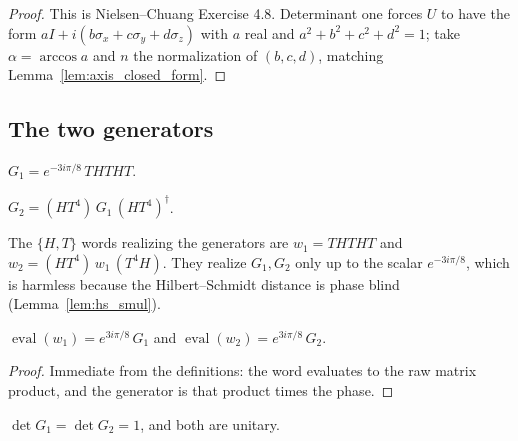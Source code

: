 \begin{proof}
  \leanok
  This is Nielsen--Chuang Exercise 4.8.  Determinant one forces $U$ to have the
  form $aI + i(b\sigma_x + c\sigma_y + d\sigma_z)$ with $a$ real and
  $a^2 + b^2 + c^2 + d^2 = 1$; take $\alpha = \arccos a$ and $n$ the
  normalization of $(b,c,d)$, matching Lemma~\ref{lem:axis_closed_form}.
\end{proof}

\subsection{The two generators}

\begin{definition}
  \label{def:g1}
  \leanok
  $G_1 = e^{-3i\pi/8}\, THTHT$.
\end{definition}

\begin{definition}
  \label{def:g2}
  \leanok
  $G_2 = (HT^4)\, G_1\, (HT^4)^\dagger$.
\end{definition}

\begin{definition}
  \label{def:g_words}
  \leanok
  The $\{H,T\}$ words realizing the generators are
  $w_1 = THTHT$ and $w_2 = (HT^4)\,w_1\,(T^4H)$.  They realize $G_1, G_2$ only
  up to the scalar $e^{-3i\pi/8}$, which is harmless because the
  Hilbert--Schmidt distance is phase blind (Lemma~\ref{lem:hs_smul}).
\end{definition}

\begin{lemma}
  \label{lem:g_word_eval}
  \leanok
  $\operatorname{eval}(w_1) = e^{3i\pi/8}\, G_1$ and
  $\operatorname{eval}(w_2) = e^{3i\pi/8}\, G_2$.
\end{lemma}

\begin{proof}
  \leanok
  Immediate from the definitions: the word evaluates to the raw matrix product,
  and the generator is that product times the phase.
\end{proof}

\begin{lemma}
  \label{lem:g_det}
  \leanok
  $\det G_1 = \det G_2 = 1$, and both are unitary.
\end{lemma}

